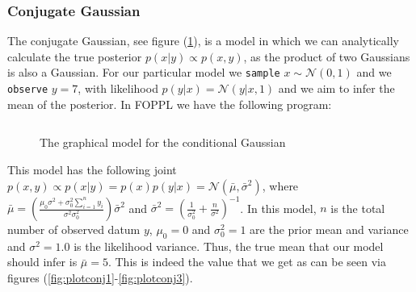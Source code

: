 \documentclass[twoside]{article}
\begin{document}
\subsubsection{Conjugate Gaussian}
The conjugate Gaussian, see figure (\ref{fig:conga}), is a model in which we can analytically calculate the true posterior $p(x | y) \propto p(x,y) $, as the product of two Gaussians is also a Gaussian. For our particular model we \texttt{sample} $x \sim \mathcal{N}(0, 1)$ and we \texttt{observe} $y = 7$, with likelihood $p(y|x) = \mathcal{N}(y | x, 1)$ and we aim to infer the mean of the posterior. In FOPPL we have the following program:
\inputminted{clojure}{code/conjugategauss.clj}
\begin{figure}[ht]
	\begin{center}
		
	\end{center}
	\caption{The graphical model for the conditional Gaussian}
	\label{fig:conga}
\end{figure}
This model has the following joint $ p(x,y) \propto p(x|y) = p(x)p(y| x) = \mathcal{N}(\bar{\mu}, \bar{\sigma}^{2})$, where $\bar{\mu} = \left(\frac{\mu_{0}\sigma^{2} + \sigma^{2}_{0}\sum_{i=1}^{n}y_{i}}{\sigma^{2}\sigma^{2}_{0}}\right) \bar{\sigma}^{2}$ and $\bar{\sigma}^{2} = \left(\frac{1}{\sigma^{2}_{0}} + \frac{n}{\sigma^{2}}\right)^{-1} $. In this model, $n$ is the total number of observed datum $y$, $\mu_{0} = 0 $ and $\sigma_{0}^{2} = 1$ are the prior mean and variance and $\sigma^{2} = 1.0 $ is the likelihood variance. Thus, the true mean that our model should infer is $\bar{\mu} = 5$. This is indeed the value that we get as can be seen via figures (\ref{fig:plotconj1}-\ref{fig:plotconj3}).
\end{document}
